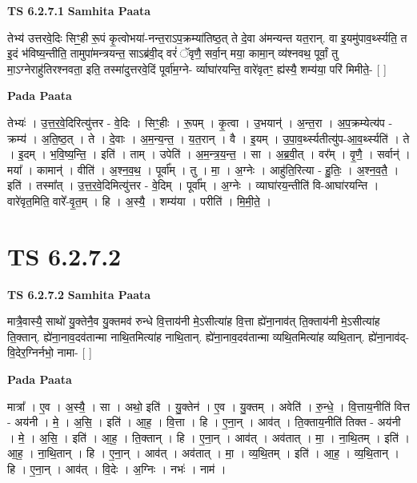 \documentclass[17pt]{extarticle}
\begin{document}
\textbf{TS 6.2.7.1 } \newline
\textbf{Samhita Paata} \newline

तेभ्य॑ उत्तरवे॒दिः सिꣳ॒॒॒ही रू॒पं कृ॒त्वोभया॑-नन्त॒राऽप॒क्रम्या॑तिष्ठ॒त् ते दे॒वा अ॑मन्यन्त यत॒रान्. वा इ॒यमु॑पाव॒र्थ्स्यति॒ त इ॒दं भ॑विष्य॒न्तीति॒ तामुपा॑मन्त्रयन्त॒ साऽब्र॑वी॒द् वरं॑ ॅवृणै॒ सर्वा॒न् मया॒ कामा॒न् व्य॑श्नवथ॒ पूर्वां॒ तु मा॒ऽग्नेराहु॑तिरश्नवता॒ इति॒ तस्मा॑दुत्तरवे॒दिं पूर्वा॑म॒ग्ने- र्व्याघा॑रयन्ति॒ वारे॑वृतꣳ॒॒ ह्य॑स्यै॒ शम्य॑या॒ परि॑ मिमीते॒- [  ] \newline

\textbf{Pada Paata} \newline

तेभ्यः॑ । उ॒त्त॒र॒वे॒दिरित्यु॑त्तर - वे॒दिः । सिꣳ॒॒हीः । रू॒पम् । कृ॒त्वा । उ॒भयान्॑ । अ॒न्त॒रा । अ॒प॒क्रम्येत्य॑प - क्रम्य॑ । अ॒ति॒ष्ठ॒त् । ते । दे॒वाः । अ॒म॒न्य॒न्त॒ । य॒त॒रान् । वै । इ॒यम् । उ॒पा॒व॒र्थ्स्यतीत्यु॑प-आ॒व॒र्थ्स्यति॑ । ते । इ॒दम् । भ॒वि॒ष्य॒न्ति॒ । इति॑ । ताम् । उपेति॑ । अ॒म॒न्त्र॒य॒न्त॒ । सा । अ॒ब्र॒वी॒त् । वर᳚म् । वृ॒णै॒ । सर्वान्॑ । मया᳚ । कामान्॑ । वीति॑ । अ॒श्न॒व॒थ॒ । पूर्वा᳚म् । तु । मा॒ । अ॒ग्नेः । आहु॑ति॒रित्या - हु॒तिः॒ । अ॒श्न॒व॒तै॒ । इति॑ । तस्मा᳚त् । उ॒त्त॒र॒वे॒दिमित्यु॑त्तर - वे॒दिम् । पूर्वा᳚म् । अ॒ग्नेः । व्याघा॑रय॒न्तीति॑ वि-आघा॑रयन्ति । वारे॑वृत॒मिति॒ वारे᳚-वृ॒त॒म् । हि । अ॒स्यै॒ । शम्य॑या । परीति॑ । मि॒मी॒ते॒ ।  \newline





\section{ TS 6.2.7.2 }

\textbf{TS 6.2.7.2 } \newline
\textbf{Samhita Paata} \newline

मात्रै॒वास्यै॒ साथो॑ यु॒क्तेनै॒व यु॒क्तमव॑ रुन्धे वि॒त्ताय॑नी मे॒ऽसीत्या॑ह वि॒त्ता ह्ये॑ना॒नाव॑त् ति॒क्ताय॑नी मे॒ऽसीत्या॑ह ति॒क्तान्. ह्ये॑ना॒नाव॒दव॑तान्मा नाथि॒तमित्या॑ह नाथि॒तान्. ह्ये॑ना॒नाव॒दव॑तान्मा व्यथि॒तमित्या॑ह व्यथि॒तान्. ह्ये॑ना॒नाव॑द्-वि॒देर॒ग्निर्नभो॒ नामा- [  ] \newline

\textbf{Pada Paata} \newline

मात्रा᳚ । ए॒व । अ॒स्यै॒ । सा । अथो॒ इति॑ । यु॒क्तेन॑ । ए॒व । यु॒क्तम् । अवेति॑ । रु॒न्धे॒ । वि॒त्ताय॒नीति॑ वित्त - अय॑नी । मे॒ । अ॒सि॒ । इति॑ । आ॒ह॒ । वि॒त्ता । हि । ए॒ना॒न् । आव॑त् । ति॒क्ताय॒नीति॑ तिक्त - अय॑नी । मे॒ । अ॒सि॒ । इति॑ । आ॒ह॒ । ति॒क्तान् । हि । ए॒ना॒न् । आव॑त् । अव॑तात् । मा॒ । ना॒थि॒तम् । इति॑ । आ॒ह॒ । ना॒थि॒तान् । हि । ए॒ना॒न् । आव॑त् । अव॑तात् । मा॒ । व्य॒थि॒तम् । इति॑ । आ॒ह॒ । व्य॒थि॒तान् । हि । ए॒ना॒न् । आव॑त् । वि॒देः । अ॒ग्निः । नभः॑ । नाम॑ ।  \newline
\end{document}
